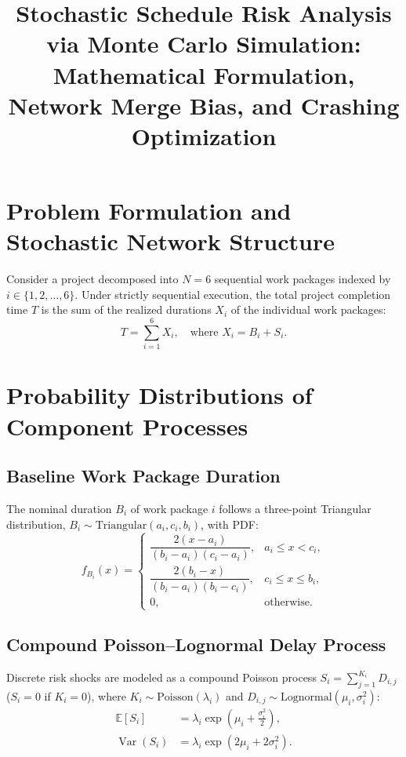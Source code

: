 \documentclass[11pt,a4paper]{article}
\title{\textbf{Stochastic Schedule Risk Analysis via Monte Carlo Simulation:\\Mathematical Formulation, Network Merge Bias, and Crashing Optimization}}
\author{}
\date{}
\DeclareMathOperator{\Var}{Var}
\newcommand{\E}{\mathbb{E}}
\begin{document}
\maketitle

\section{Problem Formulation and Stochastic Network Structure}

Consider a project decomposed into $N = 6$ sequential work packages indexed by $i \in \{1, 2, \dots, 6\}$. Under strictly sequential execution, the total project completion time $T$ is the sum of the realized durations $X_i$ of the individual work packages:
\begin{equation}
    T = \sum_{i=1}^{6} X_i, \quad \text{where } X_i = B_i + S_i.
    \label{eq:total_duration}
\end{equation}

\section{Probability Distributions of Component Processes}

\subsection{Baseline Work Package Duration}
The nominal duration $B_i$ of work package $i$ follows a three-point Triangular distribution, $B_i \sim \mathrm{Triangular}(a_i, c_i, b_i)$, with PDF:
\begin{equation}
    f_{B_i}(x) = 
    \begin{cases} 
        \dfrac{2(x - a_i)}{(b_i - a_i)(c_i - a_i)}, & a_i \le x < c_i, \\[12pt]
        \dfrac{2(b_i - x)}{(b_i - a_i)(b_i - c_i)}, & c_i \le x \le b_i, \\[12pt]
        0, & \text{otherwise}.
    \end{cases}
    \label{eq:triangular_pdf}
\end{equation}

\subsection{Compound Poisson--Lognormal Delay Process}
Discrete risk shocks are modeled as a compound Poisson process $S_i = \sum_{j=1}^{K_i} D_{i,j}$ ($S_i = 0$ if $K_i = 0$), where $K_i \sim \mathrm{Poisson}(\lambda_i)$ and $D_{i,j} \sim \mathrm{Lognormal}(\mu_i, \sigma_i^2)$:
\begin{align}
    \E[S_i] &= \lambda_i \exp\!\left(\mu_i + \frac{\sigma_i^2}{2}\right), \label{eq:compound_mean} \\
    \Var(S_i) &= \lambda_i \exp\!\left(2\mu_i + 2\sigma_i^2\right). \label{eq:compound_var}
\end{align}
\end{document}
